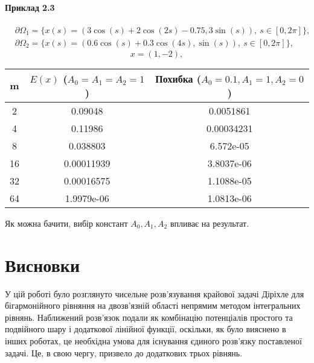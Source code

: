 \documentclass[12pt]{report}
\begin{document}
\subsubsection{Приклад 2.3}

 \begin{equation}
 \begin{split}
 	&\partial\Omega_1= \{x(s)=(3\cos(s) + 2\cos(2 s) -0.75,3\sin(s)),\ s\in[0,2\pi]\},\\
	&\partial\Omega_2= \{x(s)=(0.6\cos(s) + 0.3\cos(4s),\sin(s)),\ s\in[0,2\pi]\},
 \end{split}
 \end{equation}
  $$x=(1, -2),$$

\begin{center}
\begin{tabular}{ |c|c|c| } 
 \hline
 m & \shortstack{$E(x)$  \\  ($A_0=A_1=A_2=1$)}  & \shortstack{Похибка  \\  ($A_0=0.1, A_1= 1,A_2=0$)}  \\ 
 \hline
 2 & 0.09048 & 0.0051861 \\ 
 4 & 0.11986 & 0.00034231 \\ 
 8 & 0.038803 & 6.572e-05 \\ 
16 & 0.00011939 & 3.8037e-06 \\ 
32 & 0.00016575 & 1.1088e-05 \\ 
64 & 1.9979e-06 & 1.0813e-06 \\ 
 \hline
\end{tabular}
\end{center}
 
 Як можна бачити, вибір констант $A_0,A_1,A_2$ впливає на результат.
 
 \newpage
 
\chapter*{Висновки}

У цій роботі було розглянуто чисельне розв'язування крайової задачі Діріхле для бігармонійного рівняння на двозв'язній області непрямим методом інтегральних рівнянь. Наближений розв'язок подали як комбінацію потенціалів простого та подвійного шару і додаткової лінійної функції, оскільки, як було вияснено в інших роботах, це необхідна умова для існування єдиного розв'язку поставленої задачі. Це, в свою чергу, призвело до додаткових трьох рівнянь.
\end{document}
